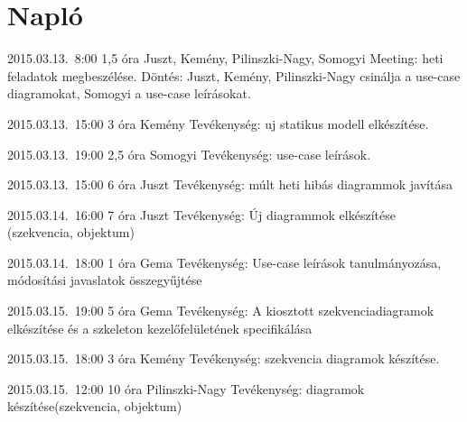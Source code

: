 %
\section{Napló}

\begin{naplo}

\bejegyzes
{2015.03.13.~8:00} %
{1,5 óra} %
{Juszt, Kemény, Pilinszki-Nagy, Somogyi} %
{Meeting: heti feladatok megbeszélése. Döntés: Juszt, Kemény, Pilinszki-Nagy csinálja a use-case diagramokat, Somogyi a use-case leírásokat.} %

\bejegyzes
{2015.03.13.~15:00} %
{3 óra} %
{Kemény} %
{Tevékenység: uj statikus modell elkészítése.} %

\bejegyzes
{2015.03.13.~19:00} %
{2,5 óra} %
{Somogyi} %
{Tevékenység: use-case leírások.} %

\bejegyzes
{2015.03.13.~15:00} %
{6 óra} %
{Juszt} %
{Tevékenység: múlt heti hibás diagrammok javítása} %

\bejegyzes
{2015.03.14.~16:00} %
{7 óra} %
{Juszt} %
{Tevékenység: Új diagrammok elkészítése (szekvencia, objektum)} %

\bejegyzes
{2015.03.14.~18:00}
{1 óra}
{Gema}
{Tevékenység: Use-case leírások tanulmányozása, módosítási javaslatok összegyűjtése}

\bejegyzes
{2015.03.15.~19:00}
{5 óra}
{Gema}
{Tevékenység: A kiosztott szekvenciadiagramok elkészítése és a szkeleton kezelőfelületének specifikálása}

\bejegyzes
{2015.03.15.~18:00} %
{3 óra} %
{Kemény} %
{Tevékenység: szekvencia diagramok készítése.} %

\bejegyzes
{2015.03.15.~12:00} %
{10 óra} %
{Pilinszki-Nagy} %
{Tevékenység: diagramok készítése(szekvencia, objektum)} %

\end{naplo}

